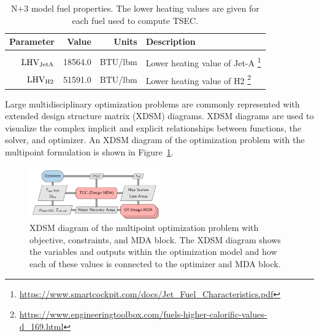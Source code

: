 \documentclass[conf]{new-aiaa}
\begin{document}
\begin{table}[hbt!]
  \centering
  \caption{
    N+3 model fuel properties.
    The lower heating values are given for each fuel used to compute TSEC.}
  \begin{tabular}{r r r l}
    \hline
    Parameter              & Value   & Units        & Description                                                                                                            \\
    \hline                                                                                                                                                                   \\
    $\rm{LHV}_{\rm{JetA}}$ & 18564.0 & \si{BTU/lbm} & Lower heating value of Jet-A \footnote{\url{https://www.smartcockpit.com/docs/Jet_Fuel_Characteristics.pdf}}           \\
    $\rm{LHV}_{\rm{H2}}$   & 51591.0 & \si{BTU/lbm} & Lower heating value of H2 \footnote{\url{https://www.engineeringtoolbox.com/fuels-higher-calorific-values-d_169.html}} \\
    \hline
  \end{tabular}
  \label{fuel_props}
\end{table}

Large multidisciplinary optimization problems are commonly represented with extended design structure matrix (XDSM) diagrams.
XDSM diagrams are used to visualize the complex implicit and explicit relationships between functions, the solver, and optimizer.
An XDSM diagram of the optimization problem with the multipoint formulation is shown in Figure~\ref{fig:N3_opt_xdsm}.

\begin{figure}[!hbt]
  \centering
  \includegraphics[width=0.5\textwidth]{N3_opt_XDSM.pdf}
  \caption{
    XDSM diagram of the multipoint optimization problem with objective, constraints, and MDA block.
    The XDSM diagram shows the variables and outputs within the optimization model and how each of these values is connected to the optimizer and MDA block.}
  \label{fig:N3_opt_xdsm}
\end{figure}
\end{document}
